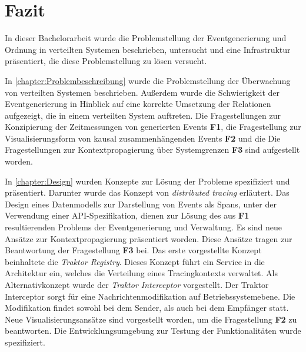 %

\chapter{Fazit}
\label{chapter:Fazit}
In dieser Bachelorarbeit wurde die Problemstellung der Eventgenerierung und Ordnung in verteilten Systemen beschrieben, untersucht und eine Infrastruktur präsentiert, die diese Problemstellung zu lösen versucht. 

In \cref{chapter:Problembeschreibung} wurde die Problemstellung der Überwachung von verteilten Systemen beschrieben. Außerdem wurde die Schwierigkeit der Eventgenerierung in Hinblick auf eine korrekte Umsetzung der Relationen aufgezeigt, die in einem verteilten System auftreten. Die Fragestellungen zur Konzipierung der Zeitmessungen von generierten Events \textbf{F1}, die Fragestellung zur Visualisierungsform von kausal zusammenhängenden Events \textbf{F2} und die Die Fragestellungen zur Kontextpropagierung über Systemgrenzen \textbf{F3} sind aufgestellt worden.

In \cref{chapter:Design} wurden Konzepte zur Lösung der Probleme spezifiziert und präsentiert. Darunter wurde das Konzept von \emph{distributed tracing} erläutert. Das Design eines Datenmodells zur Darstellung von Events als Spans, unter der Verwendung einer API-Spezifikation, dienen zur Lösung des aus \textbf{F1} resultierenden Problems der Eventgenerierung und Verwaltung. Es sind neue Ansätze zur Kontextpropagierung präsentiert worden. Diese Ansätze tragen zur Beantwortung der Fragestellung \textbf{F3} bei. Das erste vorgestellte Konzept beinhaltete die \emph{Traktor Registry}. Dieses Konzept führt ein Service in die Architektur ein, welches die Verteilung eines Tracingkontexts verwaltet. Als Alternativkonzept wurde der \emph{Traktor Interceptor} vorgestellt. Der Traktor Interceptor sorgt für eine Nachrichtenmodifikation auf Betriebssystemebene. Die Modifikation findet sowohl bei dem Sender, als auch bei dem Empfänger statt. Neue Visualisierungsansätze sind vorgestellt worden, um die Fragestellung \textbf{F2} zu beantworten. Die Entwicklungsumgebung zur Testung der Funktionalitäten wurde spezifiziert.

